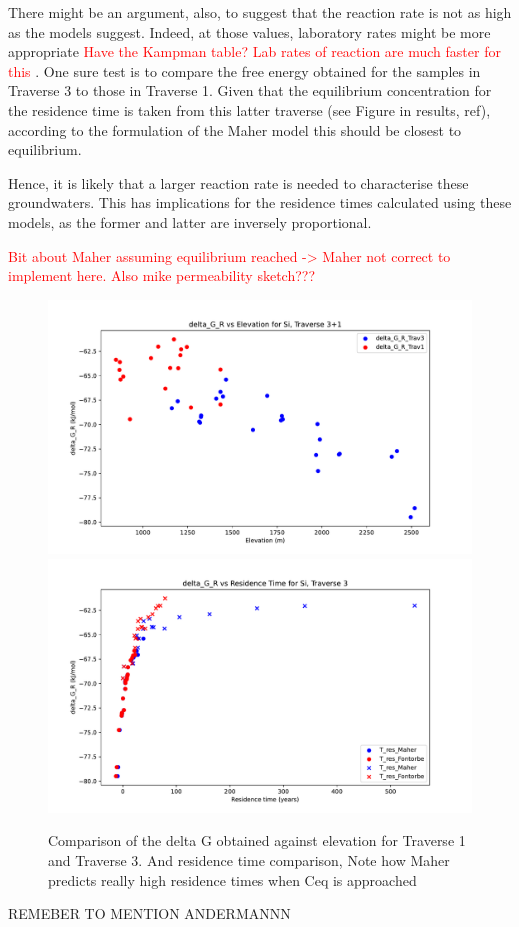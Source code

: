 \bsk

There might be an argument, also, to suggest that the reaction rate is not as high as the models suggest. Indeed, at those values, laboratory rates might be more appropriate \textcolor{red}{Have the Kampman table? Lab rates of reaction are much faster for this }. One sure test is to compare the free energy obtained for the samples in Traverse 3 to those in Traverse 1. Given that the equilibrium concentration for the residence time is taken from this latter traverse (see Figure in results, ref), according to the formulation of the Maher model this should be closest to equilibrium.

\bsk
 Hence, it is likely that a larger reaction rate is needed to characterise these groundwaters. This has implications for the residence times calculated using these models, as the former and latter are inversely proportional.


\textcolor{red}{Bit about Maher assuming equilibrium reached -> Maher not correct to implement here. Also mike permeability sketch???}


\begin{figure}[h]
    \centering
    \includegraphics[width=\textwidth]{delta_G_R_Si_comparison_Trav1.pdf}
    \includegraphics[width=\textwidth]{delta_G_R_Si_time_trav1.pdf}
    \caption{Comparison of the delta G obtained against elevation for Traverse 1 and Traverse 3. And residence time comparison, Note how Maher predicts really high residence times when Ceq is approached}
    \label{fig:discussion9}
\end{figure}

\FloatBarrier







REMEBER TO MENTION ANDERMANNN